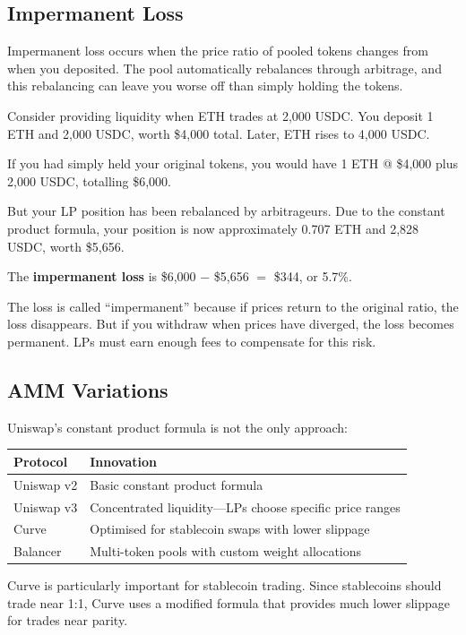 \documentclass[11pt,a4paper]{article}
\newcommand{\keyword}[1]{\textbf{\textcolor{AccentOrange}{#1}}}
\begin{document}
\subsection{Impermanent Loss}

Impermanent loss occurs when the price ratio of pooled tokens changes from when you deposited. The pool automatically rebalances through arbitrage, and this rebalancing can leave you worse off than simply holding the tokens.

Consider providing liquidity when ETH trades at 2,000 USDC. You deposit 1 ETH and 2,000 USDC, worth \$4,000 total. Later, ETH rises to 4,000 USDC.

If you had simply held your original tokens, you would have 1 ETH @ \$4,000 plus 2,000 USDC, totalling \$6,000.

But your LP position has been rebalanced by arbitrageurs. Due to the constant product formula, your position is now approximately 0.707 ETH and 2,828 USDC, worth \$5,656.

The \keyword{impermanent loss} is \$6,000 $-$ \$5,656 $=$ \$344, or 5.7\%.

The loss is called ``impermanent'' because if prices return to the original ratio, the loss disappears. But if you withdraw when prices have diverged, the loss becomes permanent. LPs must earn enough fees to compensate for this risk.

\subsection{AMM Variations}

Uniswap's constant product formula is not the only approach:

\begin{center}
\begin{tabular}{lp{8cm}}
\toprule
\textbf{Protocol} & \textbf{Innovation} \\
\midrule
Uniswap v2 & Basic constant product formula \\
Uniswap v3 & Concentrated liquidity---LPs choose specific price ranges \\
Curve & Optimised for stablecoin swaps with lower slippage \\
Balancer & Multi-token pools with custom weight allocations \\
\bottomrule
\end{tabular}
\end{center}

Curve is particularly important for stablecoin trading. Since stablecoins should trade near 1:1, Curve uses a modified formula that provides much lower slippage for trades near parity.
\end{document}
